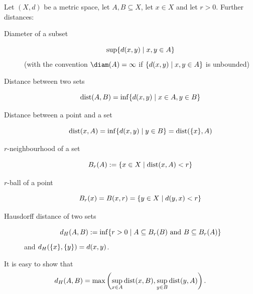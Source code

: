 \documentclass[language=english]{../../Template/TemplateLecture}
\begin{document}
\begin{bemerkung}
    Let $(X,d)$ be a metric space, let $A, B \subseteq X$, let $x \in X$ and let $r > 0$. Further distances:
    \begin{description}
        \item[Diameter of a subset] 
        \begin{equation}
            \sup\{d(x,y) \mid x,y \in A\}
        \end{equation} 
        (with the convention $\diam(A) = \infty$ if $\{d(x,y) \mid x,y \in A\}$ is unbounded)
        \item[Distance between two sets]
        \begin{equation}
            \operatorname{dist}(A,B) = \inf\{d(x,y) \mid x \in A, y \in B\}
        \end{equation}
        \item[Distance between a point and a set]
        \begin{equation}
            \operatorname{dist}(x,A) = \inf\{d(x,y) \mid y \in B\} = \operatorname{dist}(\{x\},A)
        \end{equation}
        \item[$r$-neighbourhood of a set]
        \begin{equation}
            B_r(A) := \{x \in X \mid \operatorname{dist}(x,A) < r\}
        \end{equation}  
        \item[$r$-ball of a point]
        \begin{equation}
            B_r(x) = B(x,r) = \{y \in X \mid d(y,x) < r\}
        \end{equation}
        \item[Hausdorff distance of two sets]
        \begin{equation}
            d_H(A,B) := \inf\{r > 0 \mid A \subseteq B_r(B) \text{ and } B \subseteq B_r(A)\}
        \end{equation}
        and $d_H(\{x\},\{y\}) = d(x,y)$.   
    \end{description}
\end{bemerkung}

\begin{bemerkung}
    It is easy to show that
    \begin{equation}
        d_H(A,B) = \max\left(\sup_{x \in A} \operatorname{dist}(x,B), \sup_{y \in B} \operatorname{dist}(y,A)\right).
    \end{equation}
\end{bemerkung}
\end{document}
